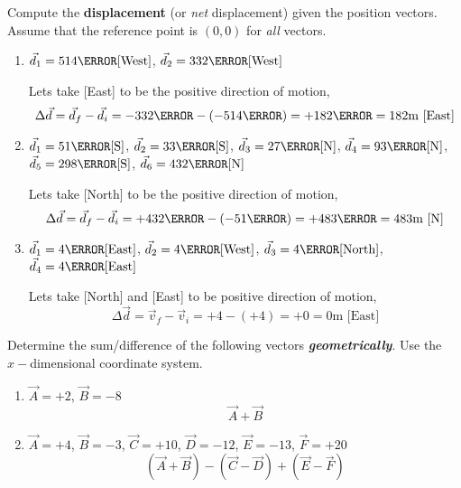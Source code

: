 \documentclass[12pt]{article} %
\newcommand{\tx}[1]{\text{#1}}
\begin{document}
\begin{qstn}[4]
	Compute the \textbf{displacement} (or \emph{net} displacement) given the position vectors. Assume that the reference point is $(0,0)$ for \emph{all} vectors.
    \begin{enumerate}[label=(\alph*)]
        \item $\vec d_1 = 514 \tx{\m}[\tx{West}]$, $\vec d_2 = 332 \tx{\m}[\tx{West}]$
		\begin{soln}
		Lets take [East] to be the positive  direction of motion,
			$$\Delta \vec d = \vec d_f - \vec d_i = -332\m - (-514 \m) = +182 \m = 182\tx{m [East]}$$
		\end{soln}


        \item $\vec d_1 = 51 \tx{\m}[\tx{S}]$, $\vec d_2 = 33 \tx{\m}[\tx{S}]$, $\vec d_3 = 27 \tx{\m}[\tx{N}]$, $\vec d_4 = 93 \tx{\m}[\tx{N}]$,$\vec d_5 = 298 \tx{\m}[\tx{S}]$, $\vec d_6 = 432 \tx{\m}[\tx{N}]$


		\begin{soln}
		Lets take [North] to be the positive  direction of motion,
			$$\Delta \vec d = \vec d_f - \vec d_i = +432 \m - (-51\m) = +483\m = 483\tx{m [N]}$$

		\end{soln}



        \item $\vec d_1 = 4\tx{\m}[\tx{East}]$, $\vec d_2 = 4\tx{\m}[\tx{West}]$, $\vec d_3 = 4\tx{\m}[\tx{North}]$, $\vec d_4 = 4\tx{\m}[\tx{East}]$

		\begin{soln}
			Lets take [North] and [East] to be positive direction of motion,
			$$\Delta \vec d =\vec v_f - \vec v_i = +4 - (+4) = +0 = 0\tx{m [East]}$$


		\end{soln}



    \end{enumerate}
\end{qstn}




\begin{qstn}[5]
	Determine the sum/difference of the following vectors \textbf{\emph{geometrically}}. Use the $x-$dimensional coordinate system.
	\begin{enumerate}[label=(\alph*)]
		\item $\vec A = +2$, $\vec B = -8$ $$\vec A + \vec B$$
		\vspace*{3cm}
		\item $\vec A = +4$, $\vec B = -3$, $\vec C = +10$, $\vec D = -12$, $\vec E = -13$, $\vec F = +20$   $$(\vec A + \vec B) - (\vec C - \vec D) + (\vec E - \vec F)$$

	\end{enumerate}
\end{qstn}
\end{document}
